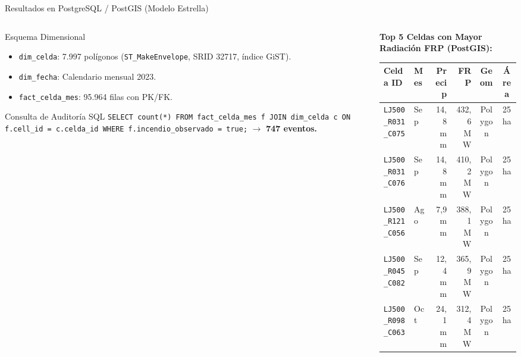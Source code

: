 \documentclass[aspectratio=169,11pt]{beamer}
\newcommand{\seccionactual}{Sustentaci\'on Final}
\begin{document}
\renewcommand{\seccionactual}{PostgreSQL}
\begin{frame}{Resultados en PostgreSQL / PostGIS (Modelo Estrella)}
  \begin{columns}
    \begin{column}{0.48\textwidth}
      \begin{block}{Esquema Dimensional}\scriptsize
        \begin{itemize}
          \item \texttt{dim\_celda}: 7.997 pol\'igonos (\texttt{ST\_MakeEnvelope}, SRID 32717, \'indice GiST).
          \item \texttt{dim\_fecha}: Calendario mensual 2023.
          \item \texttt{fact\_celda\_mes}: 95.964 filas con PK/FK.
        \end{itemize}
      \end{block}
      \begin{exampleblock}{Consulta de Auditor\'ia SQL}\tiny
        \texttt{SELECT count(*) FROM fact\_celda\_mes f JOIN dim\_celda c ON f.cell\_id = c.celda\_id WHERE f.incendio\_observado = true;} $\to$ \textbf{747 eventos.}
      \end{exampleblock}
    \end{column}
    \begin{column}{0.52\textwidth}
      \scriptsize\textbf{Top 5 Celdas con Mayor Radiaci\'on FRP (PostGIS):}
      \begin{table}[H]
        \centering\tiny
        \begin{tabular}{@{}llrrcc@{}}
          \toprule
          \textbf{Celda ID} & \textbf{Mes} & \textbf{Precip} & \textbf{FRP} & \textbf{Geom} & \textbf{\'Area} \\
          \midrule
          \texttt{LJ500\_R031\_C075} & Sep & 14,8 mm & 432,6 MW & Polygon & 25 ha \\
          \texttt{LJ500\_R031\_C076} & Sep & 14,8 mm & 410,2 MW & Polygon & 25 ha \\
          \texttt{LJ500\_R121\_C056} & Ago & 7,9 mm  & 388,1 MW & Polygon & 25 ha \\
          \texttt{LJ500\_R045\_C082} & Sep & 12,4 mm & 365,9 MW & Polygon & 25 ha \\
          \texttt{LJ500\_R098\_C063} & Oct & 24,1 mm & 312,4 MW & Polygon & 25 ha \\
          \bottomrule
        \end{tabular}
      \end{table}
    \end{column}
  \end{columns}
\end{frame}
\end{document}
